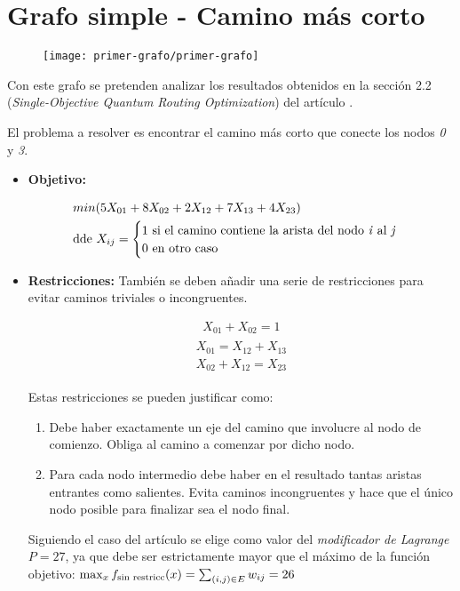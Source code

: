 \section{Grafo simple - Camino más corto}
\label{sec:4-primer grafo}

\begin{figure}[htbp]{}{}
  \centering
  \texttt{[image: primer-grafo/primer-grafo]}
\end{figure}

Con este grafo se pretenden analizar los resultados obtenidos en la sección 2.2 (\textit{Single-Objective Quantum Routing Optimization}) del artículo \cite{multi-objective_routing_optimization}.

El problema a resolver es encontrar el camino más corto que conecte los nodos \textit{0} y \textit{3}.
\begin{itemize}
\item \textbf{Objetivo:}

  \begin{align*}
    &min(5X_{01} + 8X_{02} + 2X_{12} + 7X_{13} + 4X_{23}) \\
    &\textnormal{dde } X_{ij} = \begin{cases}
      1 \textnormal{ si el camino contiene la arista del nodo \textit{i} al \textit{j}} \\
      0 \textnormal{ en otro caso}
    \end{cases}
  \end{align*}
  
\item \textbf{Restricciones:}
  También se deben añadir una serie de restricciones para evitar caminos triviales o incongruentes.

  \begin{align}
    X_{01} + X_{02} = 1
  \end{align}
  \begin{align}
    \begin{split}
      X_{01} = X_{12} + X_{13} \\
      X_{02} + X_{12} = X_{23}
    \end{split}
  \end{align}

  Estas restricciones se pueden justificar como:
  \begin{enumerate}
  \item Debe haber exactamente un eje del camino que involucre al nodo de comienzo. Obliga al camino a comenzar por dicho nodo.
  \item Para cada nodo intermedio debe haber en el resultado tantas aristas entrantes como salientes. Evita caminos incongruentes y hace que el único nodo posible para finalizar sea el nodo final.
    
  \end{enumerate}
  Siguiendo el caso del artículo se elige como valor del \textit{modificador de Lagrange} \(P=27\), ya que debe ser estrictamente mayor que el máximo de la función objetivo:
  \(\max_{x}{f_{\textnormal{sin restricc}}(x)} = \sum_{(i, j)\in{E}}{w_{ij}} = 26\)

\end{itemize}

